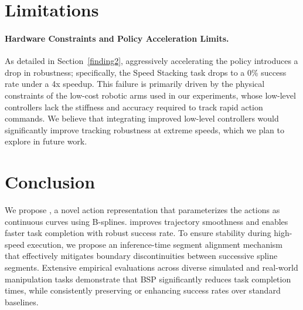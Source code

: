 \vspace{-10pt}
\section{Limitations}
\vspace{-10pt}
\paragraph{Hardware Constraints and Policy Acceleration Limits.} As detailed in Section~\ref{finding2}, aggressively accelerating the policy introduces a drop in robustness; specifically, the Speed Stacking task drops to a 0\% success rate under a 4x speedup. 
%
This failure is primarily driven by the physical constraints of the low-cost robotic arms used in our experiments, whose low-level controllers lack the stiffness and accuracy required to track rapid action commands. We believe that integrating improved low-level controllers would significantly improve tracking robustness at extreme speeds, which we plan to explore in future work.

\vspace{-10pt}
\section{Conclusion}
\vspace{-10pt}
We propose \our, a novel action representation that parameterizes the actions as continuous curves using B-splines. \our improves trajectory smoothness and enables faster task completion with robust success rate.
%
To ensure stability during high-speed execution, we propose an inference-time segment alignment mechanism that effectively mitigates boundary discontinuities between successive spline segments.
%
Extensive empirical evaluations across diverse simulated and real-world manipulation tasks demonstrate that BSP significantly reduces task completion times, while consistently preserving or enhancing success rates over standard baselines.